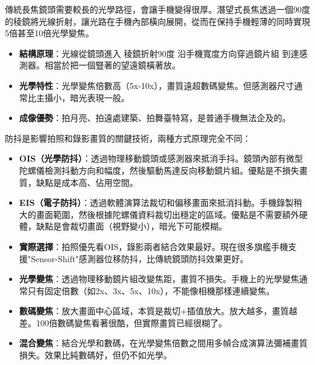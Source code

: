 傳統長焦鏡頭需要較長的光學路徑，會讓手機變得很厚。潛望式長焦透過一個90度的稜鏡將光線折射，讓光路在手機內部橫向展開，從而在保持手機輕薄的同時實現5倍甚至10倍光學變焦。

\begin{itemize}
  \item \textbf{結構原理}：光線從鏡頭進入 稜鏡折射90度 沿手機寬度方向穿過鏡片組 到達感測器。相當於把一個豎著的望遠鏡橫著放。
  \item \textbf{光學特性}：光學變焦倍數高（5x-10x），畫質遠超數碼變焦。但感測器尺寸通常比主攝小，暗光表現一般。
  \item \textbf{成像優勢}：拍月亮、拍遠處建築、拍舞臺特寫，是普通手機無法企及的。
\end{itemize}


防抖是影響拍照和錄影畫質的關鍵技術，兩種方式原理完全不同：

\begin{itemize}
  \item \textbf{OIS（光學防抖）}：透過物理移動鏡頭或感測器來抵消手抖。鏡頭內部有微型陀螺儀檢測抖動方向和幅度，然後驅動馬達反向移動鏡片組。優點是不損失畫質，缺點是成本高、佔用空間。
  \item \textbf{EIS（電子防抖）}：透過軟體演算法裁切和偏移畫面來抵消抖動。手機錄製稍大的畫面範圍，然後根據陀螺儀資料裁切出穩定的區域。優點是不需要額外硬體，缺點是會裁切畫面（視野變小），暗光下可能模糊。
  \item \textbf{實際選擇}：拍照優先看OIS，錄影兩者結合效果最好。現在很多旗艦手機支援"Sensor-Shift"感測器位移防抖，比傳統鏡頭防抖效果更好。
\end{itemize}


\begin{itemize}
  \item \textbf{光學變焦}：透過物理移動鏡片組改變焦距，畫質不損失。手機上的光學變焦通常只有固定倍數（如2x、3x、5x、10x），不能像相機那樣連續變焦。
  \item \textbf{數碼變焦}：放大畫面中心區域，本質是裁切+插值放大。放大越多，畫質越差。100倍數碼變焦看著很酷，但實際畫質已經很糊了。
  \item \textbf{混合變焦}：結合光學和數碼，在光學變焦倍數之間用多幀合成演算法彌補畫質損失。效果比純數碼好，但仍不如光學。
\end{itemize}


